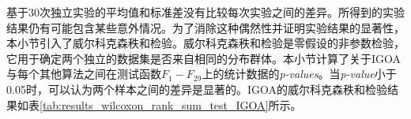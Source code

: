 基于30次独立实验的平均值和标准差没有比较每次实验之间的差异。所得到的实验结果仍有可能包含某些意外情况。为了消除这种偶然性并证明实验结果的显著性，本小节引入了威尔科克森秩和检验。威尔科克森秩和检验是零假设的非参数检验，它用于确定两个独立的数据集是否来自相同的分布群体。本小节计算了关于IGOA与每个其他算法之间在测试函数$F_1-F_{29}$上的统计数据的\emph{p-values}。当\emph{p-value}小于0.05时，可以认为两个样本之间的差异是显著的。IGOA的威尔科克森秩和检验结果如表\ref{tab:results_wilcoxon_rank_sum_test_IGOA}所示。

